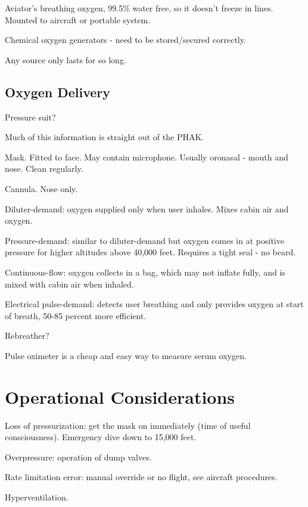 Aviator's breathing oxygen, 99.5\% water free, so it doesn't freeze in lines. Mounted to aircraft or portable system.

Chemical oxygen generators - need to be stored/secured correctly.

Any source only lasts for so long.

\subsection{Oxygen Delivery}

Pressure suit?

Much of this information is straight out of the PHAK.

Mask. Fitted to face. May contain microphone. Usually oronasal - mouth and nose. Clean regularly.

Cannula. Nose only.

Diluter-demand: oxygen supplied only when user inhales. Mixes cabin air and oxygen.

Pressure-demand: similar to diluter-demand but oxygen comes in at positive pressure for higher altitudes above 40,000 feet. Requires a tight seal - no beard.

Continuous-flow: oxygen collects in a bag, which may not inflate fully, and is mixed with cabin air when inhaled.

Electrical pulse-demand: detects user breathing and only provides oxygen at start of breath, 50-85 percent more efficient.

Rebreather?

Pulse oximeter is a cheap and easy way to measure serum oxygen.


\section{Operational Considerations}

Loss of pressurization: get the mask on immediately (time of useful consciousness). Emergency dive down to 15,000 feet.

Overpressure: operation of dump valves.

Rate limitation error: manual override or no flight, see aircraft procedures.

Hyperventilation.




